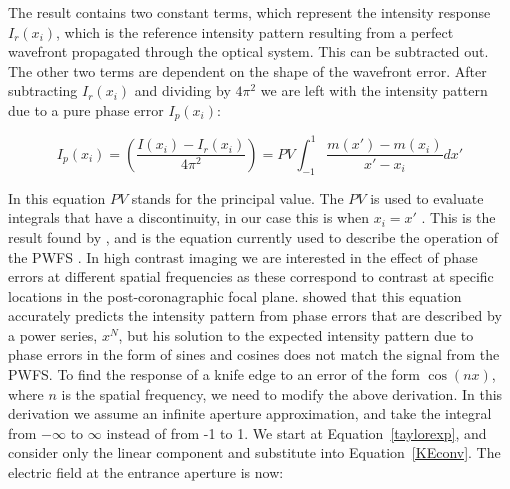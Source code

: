 The result contains two constant terms, which represent the intensity response $I_r(x_i )$, which is the reference intensity pattern resulting from a perfect wavefront propagated through the optical system. This can be subtracted out. The other two terms are dependent on the shape of the wavefront error. After subtracting  $I_r (x_i )$ and dividing by $4\pi^2$ we are left with the intensity pattern due to a pure phase error $I_p(x_i)$:


\begin{equation}
    I_p(x_i) = \left(\frac{I(x_i) - I_r(x_i)}{4\pi^2}\right)=
     PV \int_{-1}^1 \frac{m(x')-m(x_i)}{x'-x_i}dx'
\end{equation}    



In this equation $PV$ stands for the principal value. The $PV$ is used to evaluate integrals that have a discontinuity, in our case this is when $x_i=x'$ \citep{johansson1999hilbert}. This is the result found by \cite{linfoot1948theory}, and is the equation currently used to describe the operation of the PWFS  \citep{verinaud2004nature}. In high contrast imaging we are interested in the effect of phase errors at different spatial frequencies as these correspond to contrast at specific locations in the post-coronagraphic focal plane. \cite{katzoff1971quantitative} showed that this equation accurately predicts the intensity pattern from phase errors that are described by a power series, $x^{N}$, but his solution to the expected intensity pattern due to phase errors in the form of sines and cosines does not match the signal from the PWFS. To find the response of a knife edge to an error of the form $\cos(nx)$, where $n$ is the spatial frequency, we need to modify the above derivation. In this derivation we assume an infinite aperture approximation, and take the integral from $-\infty$ to $\infty$ instead of from -1 to 1. We start at Equation~\ref{taylorexp}, and consider only the linear component and substitute into Equation~\ref{KEconv}.  The electric field at the entrance aperture is now: 


